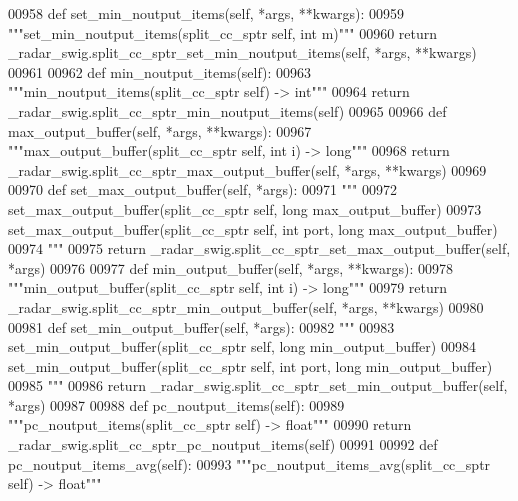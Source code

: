 \begin{DoxyCode}
{{{{{00958     \textcolor{keyword}{def }set_min_noutput_items(self, *args, **kwargs):
00959         \textcolor{stringliteral}{"""set\_min\_noutput\_items(split\_cc\_sptr self, int m)"""}
00960         \textcolor{keywordflow}{return} \_radar\_swig.split\_cc\_sptr\_set\_min\_noutput\_items(self, *args, **kwargs)
00961 
00962     \textcolor{keyword}{def }min_noutput_items(self):
00963         \textcolor{stringliteral}{"""min\_noutput\_items(split\_cc\_sptr self) -> int"""}
00964         \textcolor{keywordflow}{return} \_radar\_swig.split\_cc\_sptr\_min\_noutput\_items(self)
00965 
00966     \textcolor{keyword}{def }max_output_buffer(self, *args, **kwargs):
00967         \textcolor{stringliteral}{"""max\_output\_buffer(split\_cc\_sptr self, int i) -> long"""}
00968         \textcolor{keywordflow}{return} \_radar\_swig.split\_cc\_sptr\_max\_output\_buffer(self, *args, **kwargs)
00969 
00970     \textcolor{keyword}{def }set_max_output_buffer(self, *args):
00971         \textcolor{stringliteral}{"""}
00972 \textcolor{stringliteral}{        set\_max\_output\_buffer(split\_cc\_sptr self, long max\_output\_buffer)}
00973 \textcolor{stringliteral}{        set\_max\_output\_buffer(split\_cc\_sptr self, int port, long max\_output\_buffer)}
00974 \textcolor{stringliteral}{        """}
00975         \textcolor{keywordflow}{return} \_radar\_swig.split\_cc\_sptr\_set\_max\_output\_buffer(self, *args)
00976 
00977     \textcolor{keyword}{def }min_output_buffer(self, *args, **kwargs):
00978         \textcolor{stringliteral}{"""min\_output\_buffer(split\_cc\_sptr self, int i) -> long"""}
00979         \textcolor{keywordflow}{return} \_radar\_swig.split\_cc\_sptr\_min\_output\_buffer(self, *args, **kwargs)
00980 
00981     \textcolor{keyword}{def }set_min_output_buffer(self, *args):
00982         \textcolor{stringliteral}{"""}
00983 \textcolor{stringliteral}{        set\_min\_output\_buffer(split\_cc\_sptr self, long min\_output\_buffer)}
00984 \textcolor{stringliteral}{        set\_min\_output\_buffer(split\_cc\_sptr self, int port, long min\_output\_buffer)}
00985 \textcolor{stringliteral}{        """}
00986         \textcolor{keywordflow}{return} \_radar\_swig.split\_cc\_sptr\_set\_min\_output\_buffer(self, *args)
00987 
00988     \textcolor{keyword}{def }pc_noutput_items(self):
00989         \textcolor{stringliteral}{"""pc\_noutput\_items(split\_cc\_sptr self) -> float"""}
00990         \textcolor{keywordflow}{return} \_radar\_swig.split\_cc\_sptr\_pc\_noutput\_items(self)
00991 
00992     \textcolor{keyword}{def }pc_noutput_items_avg(self):
00993         \textcolor{stringliteral}{"""pc\_noutput\_items\_avg(split\_cc\_sptr self) -> float"""}
}}}}}
\end{DoxyCode}
